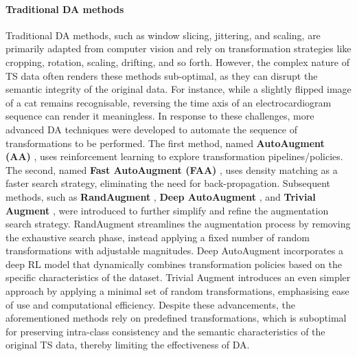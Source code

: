 \paragraph{Traditional DA methods}
Traditional DA methods, such as window slicing, jittering, and
scaling, are primarily adapted from
computer vision and rely on transformation strategies like
cropping, rotation, scaling, drifting, and so forth. However,
the complex nature of TS data often renders these
methods sub-optimal, as they can disrupt the semantic integrity
of the original data. For instance, while a slightly flipped
image of a cat remains recognisable, reversing the time axis of
an electrocardiogram sequence can render it meaningless. In
response to these challenges, more advanced DA techniques were
developed to automate the sequence of transformations to be
performed. The first method, named \textbf{AutoAugment (AA)}
\citep{cubuk2019autoaugment}, uses reinforcement learning to
explore transformation pipelines/policies. The second, named
\textbf{Fast AutoAugment (FAA)} \citep{lim2019fast}, uses
density matching as a faster search strategy, eliminating the
need for back-propagation. Subsequent methods, such as
\textbf{RandAugment} \citep{cubuk2020randaugment}, \textbf{Deep
AutoAugment} \citep{zheng_deep_2022}, and \textbf{Trivial
Augment} \citep{muller2021trivialaugment}, were introduced to
further simplify and refine the augmentation search strategy.
RandAugment streamlines the augmentation process by removing
the exhaustive search phase, instead applying a fixed number of
random transformations with adjustable magnitudes. Deep
AutoAugment incorporates a deep RL model that dynamically
combines transformation policies based on the specific
characteristics of the dataset. Trivial Augment introduces an
even simpler approach by applying a minimal set of random
transformations, emphasising ease of use and computational
efficiency. Despite these advancements, the aforementioned
methods rely on predefined transformations, which is suboptimal
for preserving intra-class consistency and the semantic
characteristics of the original TS data, thereby
limiting the effectiveness of DA.

